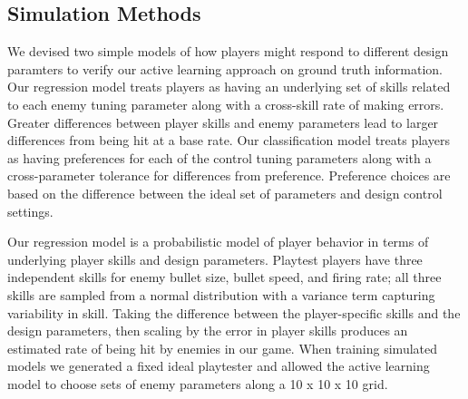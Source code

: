 \documentclass{sig-alternate}
\begin{document}
%
% 

%

\subsection{Simulation Methods}
We devised two simple models of how players might respond to different design paramters to verify our active learning approach on ground truth information.
Our regression model treats players as having an underlying set of skills related to each enemy tuning parameter along with a cross-skill rate of making errors.
Greater differences between player skills and enemy parameters lead to larger differences from being hit at a base rate.
Our classification model treats players as having preferences for each of the control tuning parameters along with a cross-parameter tolerance for differences from preference.
Preference choices are based on the difference between the ideal set of parameters and design control settings.




Our regression model is a probabilistic model of player behavior in terms of underlying player skills and design parameters.
Playtest players have three independent skills for enemy bullet size, bullet speed, and firing rate; all three skills are sampled from a normal distribution with a variance term capturing variability in skill.
Taking the difference between the player-specific skills and the design parameters, then scaling by the error in player skills produces an estimated rate of being hit by enemies in our game.
When training simulated models we generated a fixed ideal playtester and allowed the active learning model to choose sets of enemy parameters along a 10 x 10 x 10 grid.
\end{document}
